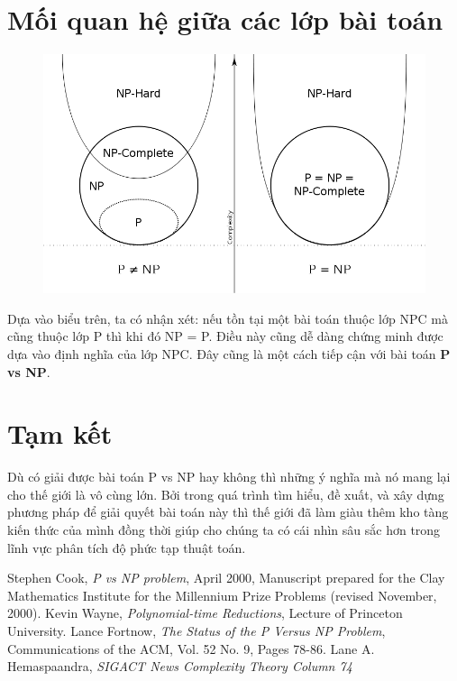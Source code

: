 \documentclass[a4paper 14pt]{article}
\begin{document}
	\section{Mối quan hệ giữa các lớp bài toán}
	\begin{figure}[H]
	\includegraphics[scale = 0.4]{Venn.png}
	\end{figure}
	
	Dựa vào biểu trên, ta có nhận xét: nếu tồn tại một bài toán thuộc lớp NPC mà cũng thuộc lớp P thì khi đó NP = P. Điều này cũng dễ dàng chứng minh được dựa vào định nghĩa của lớp NPC. Đây cũng là một cách tiếp cận với bài toán \textbf{P vs NP}.
	
	\section{Tạm kết}
	Dù có giải được bài toán P vs NP hay không thì những ý nghĩa mà nó mang lại cho thế giới là vô cùng lớn. Bởi trong quá trình tìm hiểu, đề xuất, và xây dựng phương pháp để giải quyết bài toán này thì thế giới đã làm giàu thêm kho tàng kiến thức của mình đồng thời giúp cho chúng ta có cái nhìn sâu sắc hơn trong lĩnh vực phân tích độ phức tạp thuật toán.
	
	\begin{thebibliography}{9}
		Stephen Cook, \emph{P vs NP problem}, April 2000, Manuscript prepared for the Clay Mathematics Institute for the Millennium Prize Problems (revised November, 2000).
		Kevin Wayne, \emph{Polynomial-time Reductions}, Lecture of Princeton University.
		Lance Fortnow, \emph{The Status of the P Versus NP Problem}, Communications of the ACM, Vol. 52 No. 9, Pages 78-86.
		Lane A. Hemaspaandra, \emph{SIGACT News Complexity Theory Column 74}
	\end{thebibliography}
\end{document}
